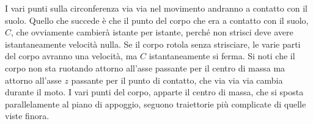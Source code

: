 \FloatBarrier
I vari punti sulla circonferenza via via nel movimento andranno a contatto con il suolo. Quello che succede è che il punto del corpo che era a contatto con il suolo, $C$, che ovviamente cambierà istante per istante, perché non strisci deve avere istantaneamente velocità nulla. Se il corpo rotola senza strisciare, le varie parti del corpo avranno una velocità, ma $C$ istantaneamente si ferma. Si noti che il corpo non sta ruotando attorno all'asse passante per il centro di massa ma attorno all'asse $z$ passante per il punto di contatto, che via via via cambia durante il moto. I vari punti del corpo, apparte il centro di massa, che si sposta parallelamente al piano di appoggio, seguono traiettorie più complicate di quelle viste finora.

\begin{figure}[htpb]
	\centering

	 
	\tikzset{
	pattern size/.store in=\mcSize, 
	pattern size = 5pt,
	pattern thickness/.store in=\mcThickness, 
	pattern thickness = 0.3pt,
	pattern radius/.store in=\mcRadius, 
	pattern radius = 1pt}
	\makeatletter
	\makeatother

	\begin{tikzpicture}[x=0.75pt,y=0.75pt,yscale=-1,xscale=1]


\end{tikzpicture}
\end{figure}
